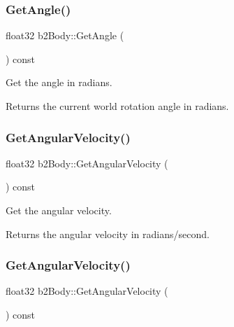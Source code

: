 \subsubsection{\texorpdfstring{Get\+Angle()}{GetAngle()}\hspace{0.1cm}{\footnotesize\ttfamily [2/2]}}
{\footnotesize\ttfamily float32 b2\+Body\+::\+Get\+Angle (\begin{DoxyParamCaption}{ }\end{DoxyParamCaption}) const}

Get the angle in radians. \begin{DoxyReturn}{Returns}
the current world rotation angle in radians. 
\end{DoxyReturn}
\mbox{\label{classb2Body_a6a404d85efc510f43575f61cb95c07a7}} 
\subsubsection{\texorpdfstring{Get\+Angular\+Velocity()}{GetAngularVelocity()}\hspace{0.1cm}{\footnotesize\ttfamily [1/2]}}
{\footnotesize\ttfamily float32 b2\+Body\+::\+Get\+Angular\+Velocity (\begin{DoxyParamCaption}{ }\end{DoxyParamCaption}) const\hspace{0.3cm}{\ttfamily [inline]}}

Get the angular velocity. \begin{DoxyReturn}{Returns}
the angular velocity in radians/second. 
\end{DoxyReturn}
\mbox{\label{classb2Body_a6a404d85efc510f43575f61cb95c07a7}} 
\subsubsection{\texorpdfstring{Get\+Angular\+Velocity()}{GetAngularVelocity()}\hspace{0.1cm}{\footnotesize\ttfamily [2/2]}}
{\footnotesize\ttfamily float32 b2\+Body\+::\+Get\+Angular\+Velocity (\begin{DoxyParamCaption}{ }\end{DoxyParamCaption}) const}

